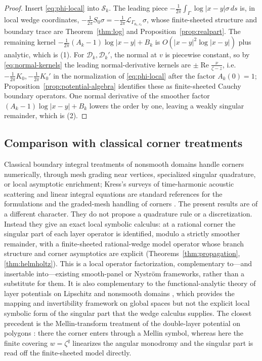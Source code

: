 \documentclass[pdflatex,sn-mathphys-num]{sn-jnl}%
\newcommand{\Lop}{\mathcal{L}}
\newcommand{\Real}{\operatorname{Re}}
\theoremstyle{thmstyleone}
\theoremstyle{thmstyletwo}
\theoremstyle{thmstylethree}
\begin{document}
\begin{proof}
Insert \eqref{eq:phi-local} into $\mathcal S_k$. The leading piece
$-\tfrac{1}{2\pi}\int_\Gamma\log|x-y|\sigma\,ds$ is, in local wedge coordinates,
$-\tfrac{1}{2\pi}S_0\sigma=-\tfrac{1}{2\pi}\Lop_{\Gamma_{\theta_v,c_v}}\sigma$,
whose finite-sheeted structure and boundary trace are
Theorem~\ref{thm:log} and Proposition~\ref{prop:realpart}. The remaining kernel
$-\tfrac{1}{2\pi}(A_k-1)\log|x-y|+B_k$ is $O(|x-y|^{2}\log|x-y|)$ plus analytic,
which is (1). For $\mathcal D_k,\mathcal D_k'$, the normal at $v$ is piecewise
constant, so by \eqref{eq:normal-kernels} the leading normal-derivative kernels
are $\pm\Real\frac{\nu}{\zeta-z}$, i.e. $-\tfrac{1}{2\pi}K_0,-\tfrac{1}{2\pi}K_0'$
in the normalization of \eqref{eq:phi-local} after the factor
$A_k(0)=1$; Proposition~\ref{prop:potential-algebra} identifies these as
finite-sheeted Cauchy boundary operators. One normal derivative of the smoother
factor $(A_k-1)\log|x-y|+B_k$ lowers the order by one, leaving a weakly singular
remainder, which is (2).
\end{proof}

\subsection{Comparison with classical corner treatments}
Classical boundary integral treatments of nonsmooth domains handle corners
numerically, through mesh grading near vertices, specialized singular
quadrature, or local asymptotic enrichment; Kress's surveys of time-harmonic
acoustic scattering and linear integral equations are standard references for
the formulations and the graded-mesh handling of corners
\cite{kress1991boundary}. The present results are of a different character. They
do not propose a quadrature rule or a discretization. Instead they give an exact
local symbolic calculus: at a rational corner the singular part of each layer
operator is identified, modulo a strictly smoother remainder, with a
finite-sheeted rational-wedge model operator whose branch structure and corner
asymptotics are explicit (Theorems~\ref{thm:propagation}, \ref{thm:helmholtz}).
This is a local operator factorization, complementary to---and insertable
into---existing smooth-panel or Nystr\"om frameworks, rather than a substitute
for them. It is also complementary to the functional-analytic theory of layer
potentials on Lipschitz and nonsmooth domains
\cite{buffa2006acoustic,ammari2009layer,gao1991layer,kenig2011layer}, which provides the mapping
and invertibility framework on global spaces but not the explicit local
symbolic form of the singular part that the wedge calculus supplies. The
closest precedent is the Mellin-transform treatment of the double-layer
potential on polygons \cite{costabel1983normal}: there the corner enters
through a Mellin symbol, whereas here the finite covering $w=\zeta^{q}$
linearizes the angular monodromy and the singular part is read off the
finite-sheeted model directly.
\end{document}

